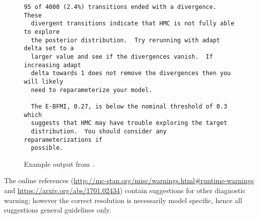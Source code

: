 \begin{figure}
\begin{Verbatim}[fontsize=\footnotesize]
  95 of 4000 (2.4%) transitions ended with a divergence.  These
  divergent transitions indicate that HMC is not fully able to explore
  the posterior distribution.  Try rerunning with adapt delta set to a
  larger value and see if the divergences vanish.  If increasing adapt
  delta towards 1 does not remove the divergences then you will likely
  need to reparameterize your model.

  The E-BFMI, 0.27, is below the nominal threshold of 0.3 which
  suggests that HMC may have trouble exploring the target
  distribution.  You should consider any reparameterizations if
  possible.
\end{Verbatim}
\caption{Example output from .}
\label{bin-diagnose-eg.figure}
\end{figure}

The online references (\url{http://mc-stan.org/misc/warnings.html#runtime-warnings}
and \url{https://arxiv.org/abs/1701.02434}) contain suggestions for
other diagnostic warning; however the correct resolution is
necessarily model specific, hence all suggestions general guidelines only.

